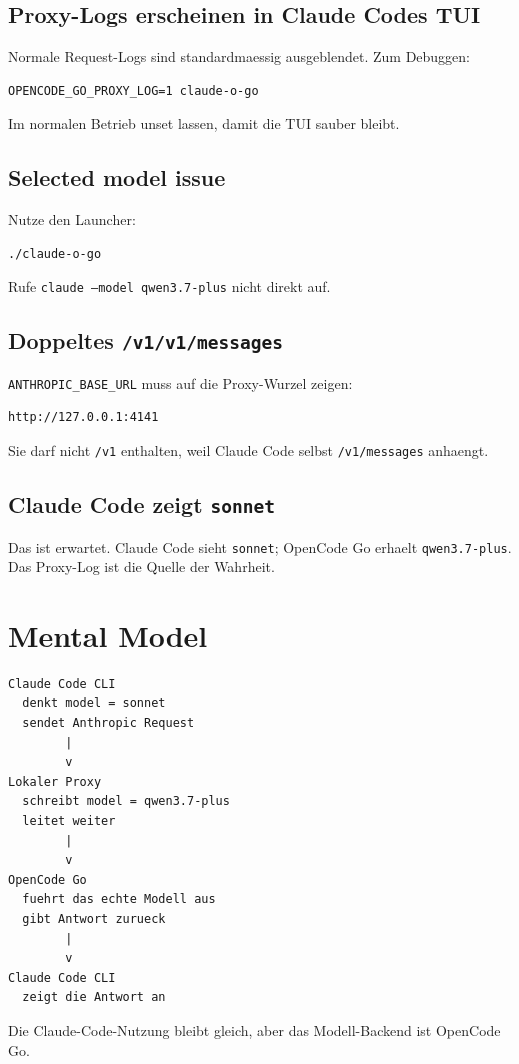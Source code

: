 \documentclass[11pt,a4paper]{article}
\newcommand{\code}[1]{\texttt{#1}}
\begin{document}
\subsection{Proxy-Logs erscheinen in Claude Codes TUI}

Normale Request-Logs sind standardmaessig ausgeblendet. Zum Debuggen:

\begin{verbatim}
OPENCODE_GO_PROXY_LOG=1 claude-o-go
\end{verbatim}

Im normalen Betrieb unset lassen, damit die TUI sauber bleibt.

\subsection{Selected model issue}

Nutze den Launcher:

\begin{verbatim}
./claude-o-go
\end{verbatim}

Rufe \code{claude --model qwen3.7-plus} nicht direkt auf.

\subsection{Doppeltes \code{/v1/v1/messages}}

\code{ANTHROPIC\_BASE\_URL} muss auf die Proxy-Wurzel zeigen:

\begin{verbatim}
http://127.0.0.1:4141
\end{verbatim}

Sie darf nicht \code{/v1} enthalten, weil Claude Code selbst
\code{/v1/messages} anhaengt.

\subsection{Claude Code zeigt \code{sonnet}}

Das ist erwartet. Claude Code sieht \code{sonnet}; OpenCode Go erhaelt
\code{qwen3.7-plus}. Das Proxy-Log ist die Quelle der Wahrheit.

\section{Mental Model}

\begin{verbatim}
Claude Code CLI
  denkt model = sonnet
  sendet Anthropic Request
        |
        v
Lokaler Proxy
  schreibt model = qwen3.7-plus
  leitet weiter
        |
        v
OpenCode Go
  fuehrt das echte Modell aus
  gibt Antwort zurueck
        |
        v
Claude Code CLI
  zeigt die Antwort an
\end{verbatim}

Die Claude-Code-Nutzung bleibt gleich, aber das Modell-Backend ist OpenCode Go.
\end{document}
